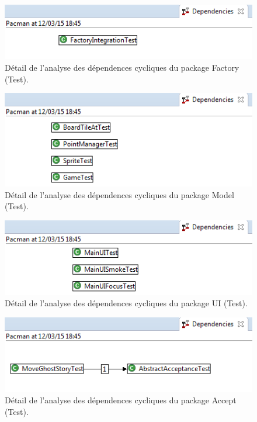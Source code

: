 \documentclass[12pt,a4paper,final]{article}
\begin{document}
\begin{figure}[ht]
	\centering
	\includegraphics[width=\textwidth]{images/DependenciesFactoryTest.png}
	\caption{\label{dependenciesFT}Détail de l'analyse des dépendences cycliques du package Factory (Test).}
\end{figure}

\begin{figure}[ht]
	\centering
	\includegraphics[width=\textwidth]{images/DependenciesModelTest.png}
	\caption{\label{dependenciesMT}Détail de l'analyse des dépendences cycliques du package Model (Test).}
\end{figure}

\begin{figure}[ht]
	\centering
	\includegraphics[width=\textwidth]{images/DependenciesUITest.png}
	\caption{\label{dependenciesUIT}Détail de l'analyse des dépendences cycliques du package UI (Test).}
\end{figure}

\begin{figure}[ht]
	\centering
	\includegraphics[width=\textwidth]{images/DependenciesAcceptTest.png}
	\caption{\label{dependenciesAT}Détail de l'analyse des dépendences cycliques du package Accept (Test).}
\end{figure}
\end{document}
